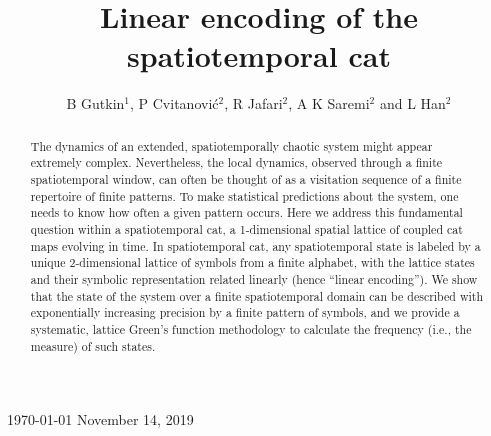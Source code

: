 \documentclass[12pt]{iopart}
\begin{document}
    \title[Spatiotemporal cat]
{Linear encoding of the spatiotemporal cat}
    \author{
B Gutkin$^1$,
P Cvitanovi{\'c}$^2$,
R Jafari$^2$,
A K Saremi$^2$
         and
L Han$^2$
    }\address{
$^1$Department of Applied Mathematics,
Holon Institute of Technology, 58102 Holon, Israel\\
$^2$School of Physics,
Georgia Institute of Technology,
Atlanta, GA 30332-0430, USA
    } 
    \vspace{10pt}
    \begin{indented}
    \item[]
    \ifboyscout\today\else
November 14, 2019
    \fi
    \end{indented}

\begin{abstract}
The dynamics of an extended, spatiotemporally chaotic system might appear
extremely complex. Nevertheless, the local dynamics, observed through a
finite spatiotemporal window, can often be thought of as a visitation
sequence of a finite repertoire of finite patterns. To make statistical
predictions about the system,  one needs to know how often a given
pattern  occurs. Here we address this fundamental question within a
spatiotemporal cat, a 1-dimensional spatial lattice of coupled cat maps
evolving in time. In spatiotemporal cat, any spatiotemporal state is
labeled by a unique 2-dimensional lattice of symbols from a finite
alphabet, with the lattice states and their symbolic representation
related linearly (hence ``linear encoding''). We show that the state of
the system over a finite spatiotemporal domain can be described with
exponentially increasing precision  by a finite pattern of symbols, and
we provide a systematic, lattice Green's function methodology to
calculate the frequency (i.e., the measure) of such states.
\end{abstract}


\end{document}
